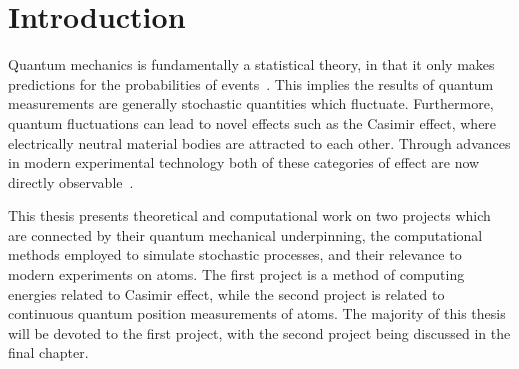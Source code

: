 \chapter{Introduction}



Quantum mechanics is fundamentally a statistical theory, in that it only makes predictions for 
the probabilities of events~\cite{Sakurai1994}.   
This implies the results of quantum measurements are generally stochastic quantities which fluctuate.
Furthermore, quantum fluctuations can lead to novel effects such as the Casimir effect, where
electrically neutral material bodies are attracted to each other.  
Through advances in modern experimental technology both of these categories of effect are now 
directly observable~\cite{Wiseman2010, Dalvit2011}.  

This thesis presents theoretical and computational work on two projects which are  
connected by their quantum mechanical underpinning, the computational methods 
employed to simulate stochastic processes, and their relevance to modern experiments on atoms.  
The first project is a method of computing energies related to Casimir effect, while the second project is related to 
continuous quantum position measurements of atoms.  The majority of this thesis will be devoted
to the first project, with the second project being discussed in the final chapter.  



